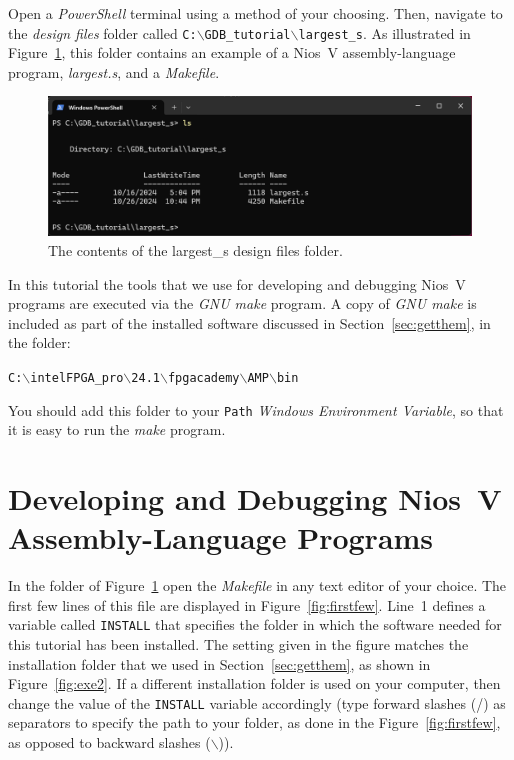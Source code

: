 \documentclass[11pt, twoside, pdftex]{article}
\begin{document}
{Open a {\it PowerShell} terminal using a method of your choosing.  Then, navigate to the 
{\it design files} folder called \texttt{C:$\backslash$GDB\_tutorial$\backslash$largest\_s}. 
As illustrated in Figure~\ref{fig:largest1}, this folder contains an example of a 
Nios~V assembly-language program, {\it largest.s}, and a {\it Makefile}. 
~\\
\begin{figure}[h]
    \begin{center}
        \includegraphics[width=.9\linewidth]{figures/largest1.png}
        \caption{The contents of the largest\_s design files folder.}
        \label{fig:largest1}
    \end{center}
\end{figure}

In this tutorial the tools that we use for developing and debugging Nios~V programs are 
executed via the {\it GNU make} program. A copy of {\it GNU make} is included as part of
the installed software discussed in Section~\ref{sec:getthem}, in the folder:

\texttt{C:$\backslash$intelFPGA\_pro$\backslash$24.1$\backslash$fpgacademy$\backslash$AMP$\backslash$bin}

You should add this folder to your \texttt{Path} {\it Windows Environment Variable}, so
that it is easy to run the {\it make} program.  

\section{Developing and Debugging Nios~V Assembly-Language Programs}
\label{sec:assembly}

In the folder of Figure~\ref{fig:largest1} open the {\it Makefile} in any text editor of your
choice. The first few lines of this file are displayed in Figure~\ref{fig:firstfew}.
Line~1 defines a variable called \texttt{INSTALL} that specifies the folder in which the 
software needed for this tutorial has been installed. The setting given in the figure matches 
the installation folder that we used in Section~\ref{sec:getthem}, as shown in 
Figure~\ref{fig:exe2}. If a different installation folder is used on your computer, then 
change the value of the \texttt{INSTALL} variable accordingly (type forward slashes (/)
as separators to specify the path to your folder, as done in the Figure~\ref{fig:firstfew},
as opposed to backward slashes ($\backslash$)). 

}
\end{document}
